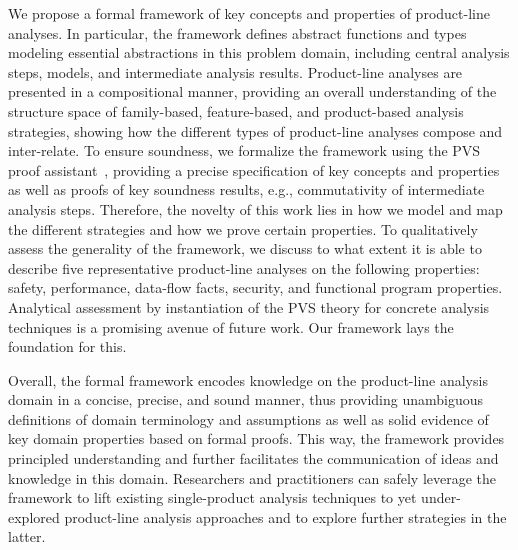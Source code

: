 

We propose a formal framework of key concepts and properties of product-line analyses. 
In particular, the framework defines abstract functions and types modeling essential abstractions in this problem domain, including central analysis steps, models, and intermediate analysis results.
Product-line analyses are  presented in a compositional manner, providing an overall understanding of the structure space of family-based, feature-based, and product-based analysis strategies, showing how the different types of product-line analyses compose and inter-relate.  
To ensure soundness, we formalize the framework using the PVS proof assistant~\citep{PVS:language}, providing a precise specification of key concepts and properties as well as proofs of key soundness results, e.g., commutativity of intermediate analysis steps. Therefore, the novelty of this work lies in how we model and map the different strategies and how we prove certain properties.
To qualitatively assess the generality of the framework, we discuss to what extent it is able to describe five representative product-line analyses on the following properties: safety, performance, data-flow facts, security, and functional program properties.
Analytical assessment by instantiation of the PVS theory for concrete analysis techniques is a promising avenue of 
future work. Our framework lays the foundation for this.

Overall, the formal framework encodes knowledge on the product-line analysis domain in a concise, precise, and sound manner, thus providing unambiguous definitions of domain terminology and assumptions as well as solid evidence of key domain properties based on formal proofs. This way, the framework provides principled understanding and further facilitates the communication of ideas and knowledge in this domain. Researchers and practitioners can safely leverage the framework to lift existing single-product analysis techniques to yet under-explored product-line analysis approaches and to explore further strategies in the latter.

